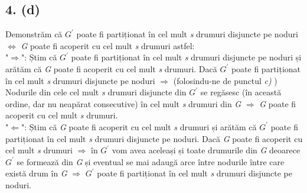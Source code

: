 \documentclass[12pt] {fphw}
\begin{document}
\subsection*{4. (d)}
 Demonstrăm că \textit{ ${}G^{'}$} poate fi partiționat în cel mult \textit{s} drumuri disjuncte pe noduri $\Leftrightarrow$ \textit{G} poate fi acoperit cu cel mult \textit{s} drumuri astfel: \\
"$\Rightarrow$": Știm că \textit{ ${}G^{'}$} poate fi partiționat în cel mult \textit{s} drumuri disjuncte pe noduri și arătăm că \textit{G} poate fi acoperit cu cel mult \textit{s} drumuri. Dacă \textit{ ${}G^{'}$} poate fi partiționat în cel mult \textit{s} drumuri disjuncte pe noduri $\Rightarrow$ (folosindu-ne de punctul \textit{c)} ) Nodurile din cele cel  mult \textit{s} drumuri disjuncte din \textit{ ${}G^{'}$} se regăsesc (în această ordine, dar nu neapărat consecutive) în cel mult  \textit{s} drumuri din \textit{G} $\Rightarrow$ \textit{G} poate fi acoperit cu cel mult \textit{s} drumuri. \\
"$\Leftarrow$": Știm că \textit{G} poate fi acoperit cu cel mult \textit{s} drumuri și arătăm că \textit{ ${}G^{'}$} poate fi partiționat în cel mult \textit{s} drumuri disjuncte pe noduri. Dacă \textit{G} poate fi acoperit cu cel mult \textit{s} drumuri $\Rightarrow$  în \textit{ ${}G^{'}$} vom avea aceleași și toate drumurile din \textit{G} deoarece \textit{ ${}G^{'}$} se formează din \textit{G} și eventual se mai adaugă arce între nodurile între care există drum în \textit{G} $\Rightarrow$  \textit{ ${}G^{'}$} poate fi partiționat în cel mult \textit{s} drumuri disjuncte pe noduri. \\

   
\end{document}
